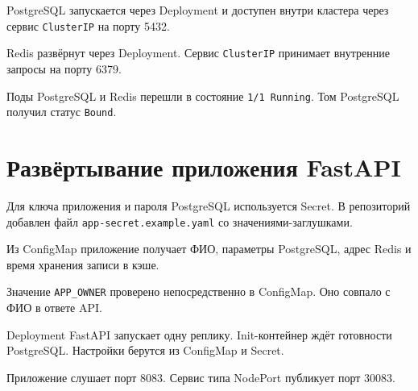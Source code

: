 
\clearpage
PostgreSQL запускается через Deployment и доступен внутри кластера
через сервис \texttt{ClusterIP} на порту 5432.



\clearpage
Redis развёрнут через Deployment. Сервис \texttt{ClusterIP}
принимает внутренние запросы на порту 6379.



\clearpage
Поды PostgreSQL и Redis перешли в состояние \texttt{1/1 Running}.
Том PostgreSQL получил статус \texttt{Bound}.


\section{Развёртывание приложения FastAPI}

Для ключа приложения и пароля PostgreSQL используется Secret.
В репозиторий добавлен файл \texttt{app-secret.example.yaml}
со значениями-заглушками.


\clearpage
Из ConfigMap приложение получает ФИО, параметры PostgreSQL,
адрес Redis и время хранения записи в кэше.


Значение \texttt{APP\_OWNER} проверено непосредственно в ConfigMap.
Оно совпало с ФИО в ответе API.


\clearpage
Deployment FastAPI запускает одну реплику. Init-контейнер ждёт
готовности PostgreSQL. Настройки берутся из ConfigMap и Secret.


\clearpage
Приложение слушает порт 8083. Сервис типа NodePort публикует порт 30083.

